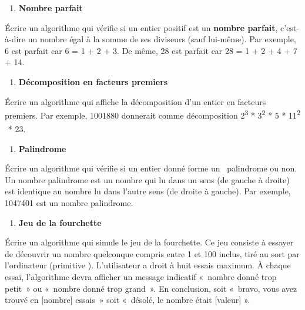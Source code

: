 \liststyleExercice
\setcounter{saveenum}{\value{enumi}}
\begin{enumerate}
\setcounter{enumi}{\value{saveenum}}
\item {\sffamily\bfseries
Nombre parfait }
\end{enumerate}
{
Écrire un algorithme qui vérifie si un entier positif est un
\textbf{nombre parfait}, c’est-à-dire un nombre égal à la somme de ses
diviseurs (sauf lui-même). Par exemple, 6 est parfait car 6 = 1 + 2 +
3. De même, 28 est parfait car 28 = 1 + 2 + 4 + 7 + 14.}

\liststyleExercice
\setcounter{saveenum}{\value{enumi}}
\begin{enumerate}
\setcounter{enumi}{\value{saveenum}}
\item {\sffamily\bfseries
Décomposition en facteurs premiers}
\end{enumerate}
{
{Écrire}{ un algorithme
qui affiche la décomposition d’un entier en facteurs premiers. Par
exemple, 1001880 donnerait comme décomposition
}{2}{\textsuperscript{3
}}{*
}{3}{\textsuperscript{2
}}{*}{ 5
}{*}{
11}{\textsuperscript{2
\ }}{*}{
2}{3}{.}}

\liststyleExercice
\setcounter{saveenum}{\value{enumi}}
\begin{enumerate}
\setcounter{enumi}{\value{saveenum}}
\item {\sffamily\bfseries
Palindrome}
\end{enumerate}
{
{Écrire}{ un algorithme
qui vérifie si un entier donné forme un \ palindrome ou non. Un
}{nombre palindrome
}{est un nombre qui lu dans un sens (de gauche
à droite) est identique au nombre lu dans l’autre sens (de droite à
gauche). Par exemple, }{1047401 est un nombre
palindrome.}}

\liststyleExercice
\setcounter{saveenum}{\value{enumi}}
\begin{enumerate}
\setcounter{enumi}{\value{saveenum}}
\item {\sffamily\bfseries
Jeu de la fourchette}
\end{enumerate}
{
{Écrire} un algorithme qui simule le jeu de la
fourchette. Ce jeu consiste à essayer de découvrir un nombre quelconque
compris entre 1 et 100 inclus, tiré au sort par l’ordinateur (primitive
). L’utilisateur a droit à huit essais
maximum. À chaque essai, l’algorithme devra afficher un message
indicatif «~nombre donné trop petit~» ou «~nombre donné trop grand~».
En conclusion, soit «~bravo, vous avez trouvé en [nombre] essais~» soit
«~désolé, le nombre était [valeur] ». }

